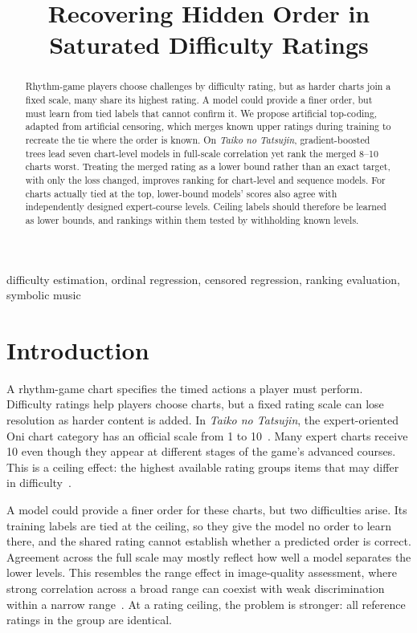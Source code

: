 \documentclass{article}
\title{Recovering Hidden Order in Saturated Difficulty Ratings}
\begin{document}
\maketitle

\begin{abstract}
Rhythm-game players choose challenges by difficulty rating, but as harder
charts join a fixed scale, many share its highest rating. A model could
provide a finer order, but must learn from tied labels that cannot confirm it.
We propose artificial top-coding, adapted from artificial censoring, which
merges known upper ratings during training to recreate the tie where the
order is known. On \textit{Taiko no Tatsujin}, gradient-boosted trees lead
seven chart-level models in full-scale correlation yet rank the merged 8--10
charts worst.
Treating the merged rating as a lower bound rather than an exact target, with
only the loss changed, improves ranking for chart-level and sequence models.
For charts actually tied at the top, lower-bound models' scores also agree
with independently designed expert-course levels. Ceiling labels should
therefore be learned as lower bounds, and rankings within them tested by
withholding known levels.
\end{abstract}

\begin{keywords}
difficulty estimation, ordinal regression, censored regression, ranking evaluation,
symbolic music
\end{keywords}

\section{Introduction}
A rhythm-game chart specifies the timed actions a player must perform.
Difficulty ratings help players choose charts, but a fixed rating scale can
lose resolution as harder content is added. In \textit{Taiko no Tatsujin},
the expert-oriented Oni chart category has an official scale from 1 to
10~\cite{bandaiSongList}. Many expert charts receive 10 even though they
appear at different stages of the game's advanced courses. This is a ceiling
effect: the highest available rating groups items that may differ in
difficulty~\cite{terwee2007ceiling}.

A model could provide a finer order for these charts, but two difficulties
arise. Its training labels are tied at the ceiling, so they give the model no
order to learn there, and the shared rating cannot establish whether a
predicted order is correct. Agreement across the full scale may mostly
reflect how well a model separates the lower levels. This resembles the range
effect in image-quality assessment, where strong correlation across a broad
range can coexist with weak discrimination within a narrow
range~\cite{li2024reqa}. At a rating ceiling, the problem is stronger: all
reference ratings in the group are identical.
\end{document}
